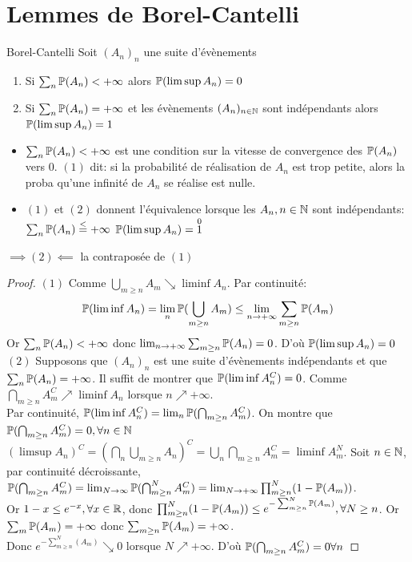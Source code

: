 \documentclass[]{report}
\begin{document}
    \section{Lemmes de Borel-Cantelli}

    \begin{lm}{Borel-Cantelli}{}
        Soit $(A_n)_n$ une suite d'évènements
        \begin{enumerate}
            \item Si $\sum_{n}\mathbb{P}(A_n)<+\infty$ alors $\mathbb{P}(\limsup A_n)=0$
            \item Si $\sum_{n} \mathbb{P}(A_n)=+\infty$ et les évènements $(A_n)_{n\in\mathbb{N}}$ sont indépendants alors $\mathbb{P}(\limsup A_n)=1$
        \end{enumerate}
    \end{lm}

    \begin{re}{}{}
        \begin{itemize}
            \item $\sum_n\mathbb{P}(A_n)<+\infty$ est une condition sur la vitesse de convergence des $\mathbb{P}(A_n)$ vers $0$. $(1)$ dit: si la probabilité de réalisation de $A_n$ est trop petite, alors la proba qu'une infinité de $A_n$ se réalise est nulle.
            \item $(1)$ et $(2)$ donnent l'équivalence lorsque les $A_n,n\in \mathbb{N}$ sont indépendants: $\sum_{n}\mathbb{P}(A_n)\overset{<}{=}+\infty$ \ssi $\mathbb{P}(\limsup A_n)=\overset{0}{1}$
        \end{itemize}
        $\implies (2)\impliedby$ la contraposée de $(1)$
    \end{re}

    \begin{proof}
        $(1)$ Comme $\bigcup_{m\ge n} A_m\searrow \liminf A_n$. Par continuité:
        \[\mathbb{P}(\liminf A_n)=\lim_n \mathbb{P}(\bigcup_{m\ge n}A_m)\le \lim_{n\to +\infty}\sum_{m\ge n}\mathbb{P}(A_m)\]
        Or $\sum_n \mathbb{P}(A_n)<+\infty$ donc $\lim_{n\to +\infty}\sum_{m\ge n}\mathbb{P}(A_n)=0$. D'où $\mathbb{P}(\limsup A_n)=0$\\
        $(2)$ Supposons que $(A_n)_n$ est une suite d'évènements indépendants et que $\sum_n \mathbb{P}(A_n)=+\infty$. Il suffit de montrer que $\mathbb{P}(\liminf A_n^C)=0$. Comme $\bigcap_{m\ge n}A_m^C\nearrow \liminf A_n$ lorsque $n\nearrow +\infty$.\\
        Par continuité, $\mathbb{P}(\liminf A_n^C)=\lim_{n}\mathbb{P}(\bigcap_{m\ge n}A_m^C)$. On montre que $\mathbb{P}(\bigcap_{m\ge n}A_m^C)=0,\forall n\in \mathbb{N}$\\
        $(\limsup A_n)^C=(\bigcap_n\bigcup_{m\ge n}A_n)^C=\bigcup_n\bigcap_{m\ge n}A_m^C=\liminf A_m^N$. Soit $n\in \mathbb{N}$, par continuité décroissante, $\mathbb{P}(\bigcap_{m\ge n}A_m^C)=\lim_{N\to \infty}\mathbb{P}(\bigcap_{m\ge n}^N A_m^C)=\lim_{N\to +\infty}\prod_{m\ge n}^{N}(1-\mathbb{P}(A_m))$.\\
        Or $1-x\le e^{-x},\forall x\in \mathbb{R}$, donc $\prod_{m\ge n}^{N}(1-\mathbb{P}(A_m))\le e^{-\sum_{m\ge n}^{N}\mathbb{P}(A_m)},\forall N\ge n$. Or $\sum_m\mathbb{P}(A_m)=+\infty$ donc $\sum_{m\ge n}\mathbb{P} (A_m)=+\infty$.\\
        Donc $e^{-\sum_{m\ge n}^{N}(A_m)}\searrow 0$ lorsque $N\nearrow +\infty$. D'où $\mathbb{P}(\bigcap_{m\ge n}A_m^C)=0\forall n$
    \end{proof}
\end{document}
